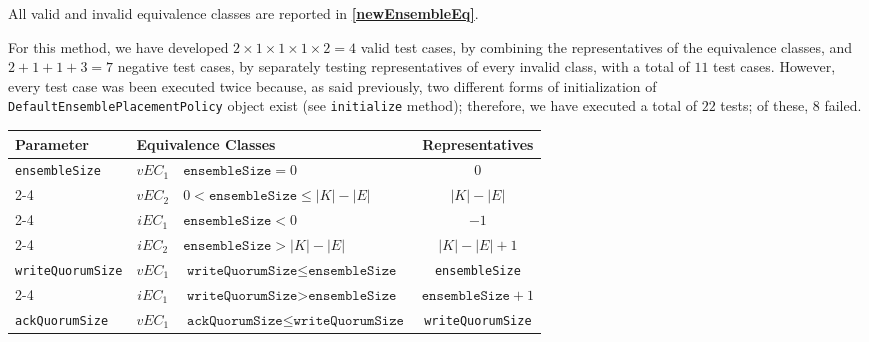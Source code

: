 \documentclass[sigconf]{acmart}
\begin{document}
All valid and invalid equivalence classes are reported in \textbf{\cref{newEnsembleEq}}.

For this method, we have developed $2 \times 1 \times 1 \times 1 \times 2 = 4$ valid test cases, by combining the representatives of the equivalence classes, and $2 + 1 + 1 + 3 = 7$ negative test cases, by separately testing representatives of every invalid class, with a total of $11$ test cases. However, every test case was been executed twice because, as said previously, two different forms of initialization of \texttt{DefaultEnsemblePlacementPolicy} object exist (see \texttt{initialize} method); therefore, we have executed a total of $22$ tests; of these, $8$ failed.

\begin{table*}
\footnotesize
\caption{Equivalence classes and representatives of \texttt{newEnsemble} method}
\label{newEnsembleEq}
\centering
\begin{tabular}{l|cm{10.5cm}|c}
\toprule
 
\textbf{Parameter} & \multicolumn{2}{|l|}{\textbf{Equivalence Classes}} & \textbf{Representatives} \\
\midrule
    
\texttt{ensembleSize} & $vEC_1$ & $\texttt{ensembleSize} = 0$ & $0$

\\\cline{2-4}

& $vEC_2$ & $0 < \texttt{ensembleSize} \leq |K| - |E|$ & $|K| - |E|$

\\\cline{2-4}

& $iEC_1$ & $\texttt{ensembleSize} < 0$ & $-1$

\\\cline{2-4}

& $iEC_2$ & $\texttt{ensembleSize} > |K| - |E|$ & $|K| - |E| + 1$

\\\hline

\texttt{writeQuorumSize} & $vEC_1$ & $\texttt{writeQuorumSize} \leq \texttt{ensembleSize}$  & \texttt{ensembleSize}

\\\cline{2-4}

& $iEC_1$ & $\texttt{writeQuorumSize} > \texttt{ensembleSize}$  & $\texttt{ensembleSize} + 1$
	
\\\hline

\texttt{ackQuorumSize} & $vEC_1$ & $\texttt{ackQuorumSize} \leq \texttt{writeQuorumSize}$  & \texttt{writeQuorumSize}


\end{tabular}
\end{table*}
\end{document}
